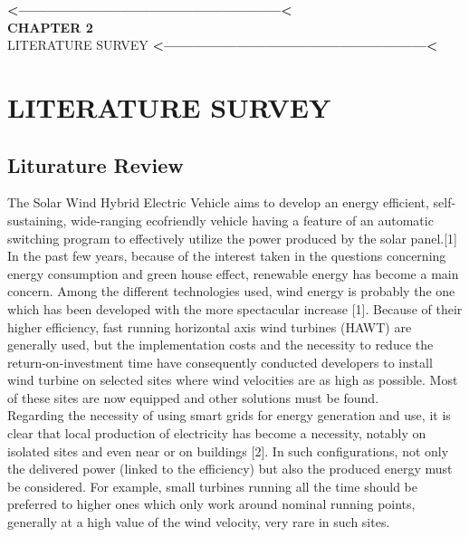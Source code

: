 \documentclass[a4paper,12pt]{article}
\begin{document}
\newpage
\thispagestyle{empty}
\vspace*{0.25\textheight}
\begin{center}
\begin{center}
{\bfseries\LARGE <------------------------------------------------------<}\\
{\bfseries\LARGE CHAPTER 2}\\[2cm]


{\scshape\Huge LITERATURE SURVEY}
{\bfseries\LARGE <------------------------------------------------------<}
\end{center}
\end{center}

\newpage
\section{LITERATURE SURVEY}

\subsection{Liturature Review}


The Solar Wind Hybrid Electric Vehicle aims to
develop an energy efficient, self-sustaining,
wide-ranging ecofriendly vehicle having a
feature of an automatic switching program to
effectively utilize the power produced by the
solar panel.[1]\\

In the past few years, because of the interest taken in the questions concerning energy consumption and green house effect, renewable energy has become a main concern. Among the different technologies used, wind energy is probably the one which has been developed with the more spectacular increase [1]. Because of their higher efficiency, fast running horizontal axis wind turbines (HAWT) are generally used, but the implementation costs and the necessity to reduce the return-on-investment time have consequently conducted developers to install wind turbine on selected sites where wind velocities are as high as possible. Most of these sites are now equipped and other solutions must be found.\\

Regarding the necessity of using smart grids for energy generation and use, it is clear that local production of electricity has become a necessity, notably on isolated sites and even near or on buildings [2]. In such configurations, not only the delivered power (linked to the efficiency) but also the produced energy must be considered. For example, small turbines running all the time should be preferred to higher ones which only work around nominal running points, generally at a high value of the wind velocity, very rare in such sites.\\
\end{document}
